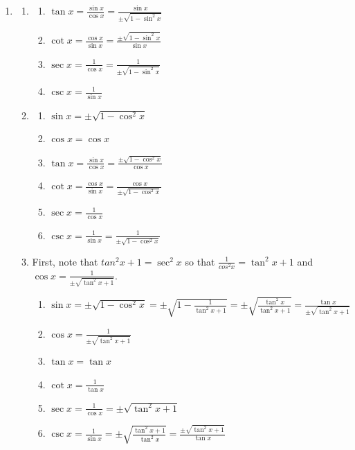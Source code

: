 \documentclass[english]{book}
\begin{document}
\begin{enumerate}
  \item \begin{enumerate}  %
    \item \begin{enumerate}[\hspace{1cm}a)]
            \item $\tan x = \frac{\sin x}{\cos x}=\frac{\sin x}{\pm\sqrt{1-\sin^{2} x}}$
            \item $\cot x = \frac{\cos x}{\sin x}=\frac{\pm\sqrt{1-\sin^{2} x}}{\sin x}$
            \item $\sec x = \frac{1}{\cos x} = \frac{1}{\pm \sqrt{1-\sin^{2} x}}$
            \item $\csc x = \frac{1}{\sin x}$
          \end{enumerate}
    \item \begin{enumerate}[\hspace{1cm}a)]
            \item $\sin x = \pm \sqrt{1 - \cos^{2} x}$
            \item $\cos x = \cos x$
            \item $\tan x = \frac{\sin x}{\cos x}=\frac{\pm\sqrt{1-\cos^{2} x}}{\cos x}$
            \item $\cot x = \frac{\cos x}{\sin x}=\frac{\cos x}{\pm\sqrt{1-\cos^{2} x}}$
            \item $\sec x = \frac{1}{\cos x}$
            \item $\csc x = \frac{1}{\sin x} = \frac{1}{\pm \sqrt{1 - \cos^{2} x}}$
          \end{enumerate}
    \item First, note that $tan^{2} x + 1 = \sec^{2} x$ so that $\frac{1}{cos^{2} x} = \tan^{2} x + 1$ and $\cos x = \frac{1}{\pm \sqrt{\tan^{2} x + 1}}$.
          \begin{enumerate}[\hspace{1cm}a)]
            \item $\sin x = \pm\sqrt{1-\cos^{2} x} = \pm\sqrt{1-\frac{1}{\tan^{2} x+1}} = \pm\sqrt{\frac{\tan^{2} x}{\tan^{2} x+1}} = \frac{\tan x}{\pm\sqrt{\tan^{2} x+1}}$
            \item $\cos x = \frac{1}{\pm \sqrt{\tan^{2} x + 1} }$
            \item $\tan x = \tan x$
            \item $\cot x = \frac{1}{\tan x}$
            \item $\sec x = \frac{1}{\cos x} = \pm \sqrt{\tan^{2} x + 1}$
            \item $\csc x = \frac{1}{\sin x} = \pm \sqrt{ \frac{\tan^{2} x + 1}{\tan^{2} x} } = \frac{\pm \sqrt{\tan^{2} x + 1}}{\tan x}$

\end{enumerate}
\end{enumerate}
\end{enumerate}
\end{document}
